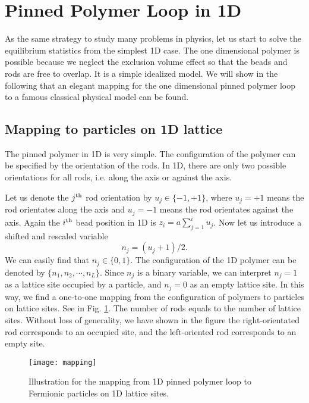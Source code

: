 \section{Pinned Polymer Loop in 1D}
\label{sec:pinned_polymer_loop_in_1d}

As the same strategy to study many problems in physics, let us start to solve the equilibrium statistics from the simplest 1D case. The one dimensional polymer is possible because we neglect the exclusion volume effect so that the beads and rods are free to overlap. It is a simple idealized model. We will show in the following that an elegant mapping for the one dimensional pinned polymer loop to a famous classical physical model can be found. 

\subsection{Mapping to particles on 1D lattice}
\label{sub:mapping_to_particles_on_1d_lattice}

The pinned polymer in 1D is very simple. The configuration of the polymer can be specified by the orientation of the rods. In 1D, there are only two possible orientations for all rods, i.e. along the axis or against the axis. 

Let us denote the $j^{\rm{th}}$ rod orientation by $u_j\in\{-1, +1\}$, where $u_j = +1$ means the rod orientates along the axis and $u_j = -1$ means the rod orientates against the axis. Again the $i^{\rm{th}}$ bead position in 1D is $z_i = a\sum_{j=1}^{i}u_j$. Now let us introduce a shifted and rescaled variable 
\begin{equation}
    \label{eq:variableu2n}
    n_j = (u_j + 1)/2. 
\end{equation}
We can easily find that $n_j\in\{0,1\}$. The configuration of the 1D polymer can be denoted by $\{n_1, n_2, \cdots, n_L\}$. Since $n_j$ is a binary variable, we can interpret $n_j = 1$ as a lattice site occupied by a particle, and $n_j = 0$ as an empty lattice site. In this way, we find a one-to-one mapping from the configuration of polymers to particles on lattice sites. See in Fig. \ref{fig:mapping}. The number of rods equals to the number of lattice sites. Without loss of generality, we have shown in the figure the right-orientated rod corresponds to an occupied site, and the left-oriented rod corresponds to an empty site.

\begin{figure}[htpb]
    \centering
    \texttt{[image: mapping]}
    \caption{Illustration for the mapping from 1D pinned polymer loop to Fermionic particles on 1D lattice sites. }
    \label{fig:mapping}
\end{figure}

